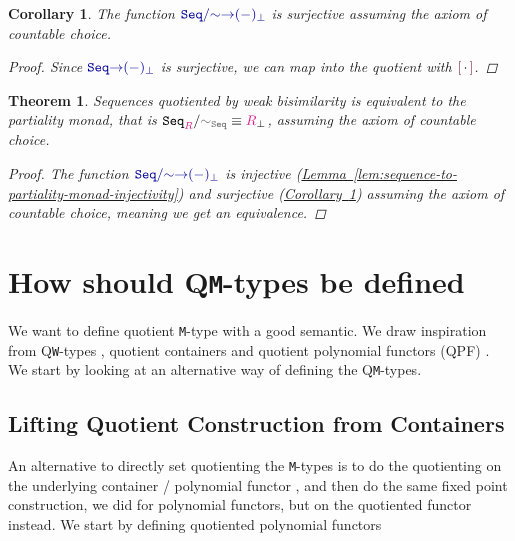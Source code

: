 \documentclass[twoside,11pt,openright]{report}
\theoremstyle{plain} %
\newtheorem{thm}{Theorem}[section]
\newtheorem{cor}{Corollary}
\theoremstyle{definition}
\newtheorem{defn}[thm]{Definition}%
\theoremstyle{remark}
\newcommand*{\lemref}[1]{\hyperref[lem:#1]{Lemma~\ref*{lem:#1}}}
\newcommand*{\corref}[1]{\hyperref[cor:#1]{Corollary~\ref*{cor:#1}}}
\newcommand*{\term}[1]{\textcolor{green!30!black}{#1}} %
\newcommand*{\type}[1]{\textcolor{magenta!90!black}{#1}}
\newcommand*{\containerpair}[2]{\ensuremath{\colorlet{savedleftcolor}{.}\color{orange}\left(\color{savedleftcolor}#1\,\textcolor{orange}{\mathbf{,}}\,#2\color{orange}\right)\color{savedleftcolor}}}
\newcommand*{\universe}[1]{\textcolor{orange!80!black}{#1}}
\newcommand*{\relation}[1]{\textcolor{gray!75!black}{\ensuremath{\mathtt{#1}}}}
\newcommand*{\function}[1]{\textcolor{blue!60!black}{\ensuremath{\mathtt{#1}}}}
\newcommand*{\constructor}[1]{\textcolor{purple!60!black}{\ensuremath{\mathtt{#1}}}}
\newcommand*{\typeformer}[1]{\ensuremath{\mathtt{#1}}}
\newcommand*{\quotientconstructor}[1]{\constructor{[}\,#1\,\constructor{]}}
\begin{document}
\begin{cor}
  \label{cor:sequence-partiality-monad-surjective}
  The function \(\function{Seq/{\sim}{\rightarrow}(-)_{\bot}}\) is surjective assuming the axiom of countable choice.
  \begin{proof}
    Since \(\function{Seq{\rightarrow}(-)_{\bot}}\) is surjective, we can map into the quotient with \(\quotientconstructor{{\cdot}}\).
  \end{proof}
\end{cor}
\begin{thm}
  \label{thm:sequence-partiality-monad-eq}
  Sequences quotiented by weak bisimilarity is equivalent to the partiality monad, that is \(\typeformer{Seq}_{\type{R}} / \relation{\sim_{Seq}} \equiv \type{R}_{\bot}\), assuming the axiom of countable choice.
  \begin{proof}
 The function \(\function{Seq/{\sim}{\rightarrow}(-)_\bot}\) is injective (\lemref{sequence-to-partiality-monad-injectivity}) and surjective (\corref{sequence-partiality-monad-surjective}) assuming the axiom of countable choice, meaning we get an equivalence.
\end{proof}
\end{thm}

\section{How should Q\texttt{M}-types be defined}
We want to define quotient \texttt{M}-type with a good semantic. We draw inspiration from Q\texttt{W}-types \cite{DBLP:Constructing-QIITs}, quotient containers \cite{DBLP:quotient-container} and quotient polynomial functors (QPF) \cite{DBLP:QM-lean}. We start by looking at an alternative way of defining the Q\texttt{M}-types.

\subsection{Lifting Quotient Construction from Containers}
An alternative to directly set quotienting the \texttt{M}-types is to do the quotienting on the underlying container \cite{DBLP:quotient-container} / polynomial functor \cite{DBLP:QM-lean}, and then do the same fixed point construction, we did for polynomial functors, but on the quotiented functor instead. We start by defining quotiented polynomial functors
    
\end{document}
